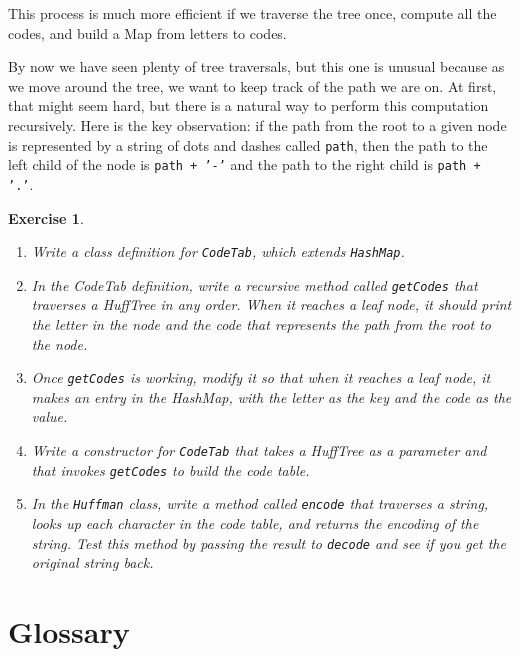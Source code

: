 \documentclass[12pt]{book}
\theoremstyle{exercise}
\newtheorem{exercise}{Exercise}[chapter]
\begin{document}
This process is much more efficient if we traverse the tree once,
compute all the codes, and build a Map from letters to
codes.

By now we have seen plenty of tree traversals, but this one is
unusual because as we move around the tree, we want to keep track
of the path we are on.  At first, that might seem hard, but there
is a natural way to perform this computation recursively.  Here
is the key observation: if the path from the root to a given node
is represented by a string of dots and dashes called {\tt path},
then the path to the left child of the node is {\tt path + '-'}
and the path to the right child is {\tt path + '.'}.

\begin{exercise}
\begin{enumerate}
\item Write a class definition for {\tt CodeTab}, which extends
{\tt HashMap}.

\item In the CodeTab definition,
write a recursive method called {\tt getCodes} that traverses
a HuffTree in any order.  When it reaches a leaf node, it should
print the letter in the node and the code that represents the path
from the root to the node.

\item Once {\tt getCodes} is working, modify it so that when it
reaches a leaf node, it makes an entry in the HashMap, with
the letter as the key and the code as the value.

\item Write a constructor for {\tt CodeTab} that takes a HuffTree as
a parameter and that invokes {\tt getCodes} to build the code
table.

\item In the {\tt Huffman} class, write a method called {\tt encode}
that traverses a string, looks up each character in the code
table, and returns the encoding of the string.  Test this method
by passing the result to {\tt decode} and see if you get the
original string back.

\end{enumerate}

\end{exercise}

\section{Glossary}
\end{document}
